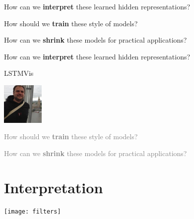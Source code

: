 \documentclass{beamer}
\let\tempone\itemize
\let\temptwo\enditemize
\renewenvironment{itemize}{\tempone\addtolength{\itemsep}{0.5\baselineskip}}{\temptwo}
\newcommand{\air}{\vspace{0.25cm}}
\newcommand{\Cite}[1]{{\footnotesize \citep{#1}}}
\begin{document}
\begin{frame}
  \centerline{}
  \air 
  \air

  \begin{itemize}
  \item How can we \textbf{interpret} these learned hidden representations? 
    \air 

    

  \item  How should we \textbf{train} these style of models? 
    \air 
  \item  How can we \textbf{shrink} these models for practical applications? 
  \end{itemize}
\end{frame}


\begin{frame}
  \centerline{}
  \air 
  \air

  \begin{itemize}
  \item How can we \textbf{interpret} these learned hidden representations? 

    \begin{center}
      \alert{LSTMVis} 

      \Cite{Strobelt2016}

      \includegraphics[width=2cm]{hen}
    \end{center}


    \air 

    

  \item  \textcolor{gray}{How should we \textbf{train} these style of models? \Cite{Wiseman2016a}}
    \air 
  \item  \textcolor{gray}{How can we \textbf{shrink} these models for practical applications? \Cite{Kim2016a}}
  \end{itemize}
\end{frame}

\section{Interpretation}

\begin{frame}
  \air 
  \texttt{[image: filters]}
  \begin{center}
     \Cite{DBLP:conf/eccv/ZeilerF14}
  \end{center}
\end{frame}
\end{document}
